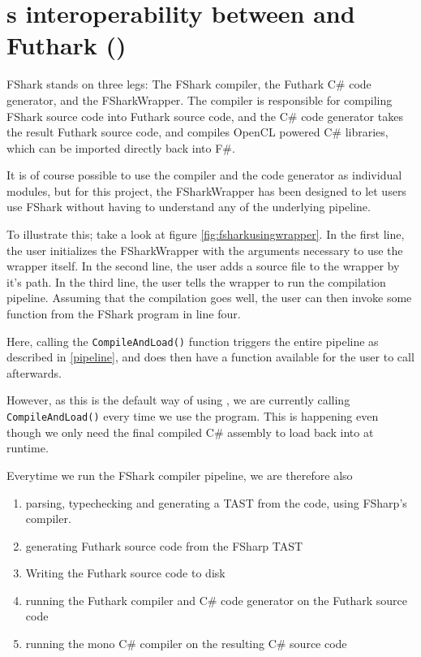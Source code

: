 \chapter{\fshark{}s interoperability between \fsharp and Futhark (\csharp{})}
FShark stands on three legs: The FShark compiler, the Futhark C\# code generator, and
the FSharkWrapper.
The compiler is responsible for compiling FShark source code into Futhark
source code, and the C\# code generator takes the result Futhark source code,
and compiles OpenCL powered C\# libraries, which can be imported directly back
into F\#.

It is of course possible to use the compiler and the code generator as
individual modules, but for this project, the FSharkWrapper has been designed to
let users use FShark without having to understand any of the underlying
pipeline.

To illustrate this; take a look at figure \ref{fig:fsharkusingwrapper}. In the
first line, the user initializes the FSharkWrapper with the arguments necessary
to use the wrapper itself. In the second line, the user adds a source file to
the wrapper by it's path.
In the third line, the user tells the wrapper to run the compilation pipeline.
Assuming that the compilation goes well, the user can then invoke some function
from the FShark program in line four.

Here, calling the \texttt{CompileAndLoad()} function triggers the entire \fshark{}
pipeline as described in \ref{pipeline}, and does then have a function available
for the user to call afterwards.

However, as this is the default way of using \fshark{}, we are currently calling
\texttt{CompileAndLoad()} every time we use the \fshark{} program.
This is happening even though we only need the final compiled C\# assembly to
load back into \fsharp{} at runtime. 

Everytime we run the FShark compiler pipeline, we are therefore also
\begin{enumerate}
\item parsing, typechecking and generating a TAST from the \fshark{} code,
  using FSharp's compiler.
\item generating Futhark source code from the FSharp TAST
\item Writing the Futhark source code to disk
\item running the Futhark compiler and C\# code generator on the Futhark source
  code
\item running the mono C\# compiler on the resulting C\# source code
\end{enumerate}

